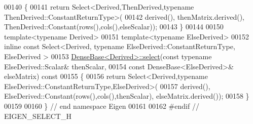 \begin{DoxyCode}
00140 \textcolor{keyword}{}\{
00141   \textcolor{keywordflow}{return} Select<Derived,ThenDerived,typename ThenDerived::ConstantReturnType>(
00142     derived(), thenMatrix.derived(), ThenDerived::Constant(rows(),cols(),elseScalar));
00143 \}
00144 
00150 \textcolor{keyword}{template}<\textcolor{keyword}{typename} Derived>
00151 \textcolor{keyword}{template}<\textcolor{keyword}{typename} ElseDerived>
00152 \textcolor{keyword}{inline} \textcolor{keyword}{const} Select<Derived, typename ElseDerived::ConstantReturnType, ElseDerived >
00153 \hyperlink{group___core___module_a65e78cfcbc9852e6923bebff4323ddca}{DenseBase<Derived>::select}(\textcolor{keyword}{const} \textcolor{keyword}{typename} ElseDerived::Scalar& thenScalar,
00154                            \textcolor{keyword}{const} DenseBase<ElseDerived>& elseMatrix)\textcolor{keyword}{ const}
00155 \textcolor{keyword}{}\{
00156   \textcolor{keywordflow}{return} Select<Derived,typename ElseDerived::ConstantReturnType,ElseDerived>(
00157     derived(), ElseDerived::Constant(rows(),cols(),thenScalar), elseMatrix.derived());
00158 \}
00159 
00160 \} \textcolor{comment}{// end namespace Eigen}
00161 
00162 \textcolor{preprocessor}{#endif // EIGEN\_SELECT\_H}
\end{DoxyCode}
